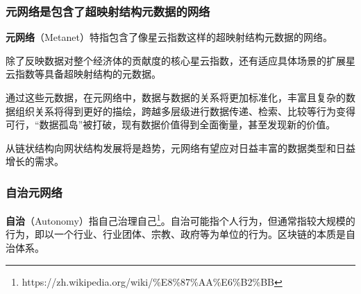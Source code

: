\subsubsection{元网络是包含了超映射结构元数据的网络}
\textbf{元网络}（Metanet）特指包含了像星云指数这样的超映射结构元数据的网络。

除了反映数据对整个经济体的贡献度的核心星云指数，还有适应具体场景的扩展星云指数等具备超映射结构的元数据。

通过这些元数据，在元网络中，数据与数据的关系将更加标准化，丰富且复杂的数据组织关系将得到更好的描绘，跨越多层级进行数据传递、检索、比较等行为变得可行，“数据孤岛”被打破，现有数据价值得到全面衡量，甚至发现新的价值。

从链状结构向网状结构发展将是趋势，元网络有望应对日益丰富的数据类型和日益增长的需求。

\subsubsection{自治元网络}
\textbf{自治}（Autonomy）指自己治理自己\footnote{https://zh.wikipedia.org/wiki/\%E8\%87\%AA\%E6\%B2\%BB}。自治可能指个人行为，但通常指较大规模的行为，即以一个行业、行业团体、宗教、政府等为单位的行为。区块链的本质是自治体系。

